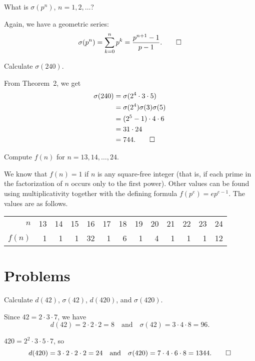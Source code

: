  What is $\sigma(p^n)$, $n = 1, 2, \dots$?
\begin{solution}
  Again, we have a geometric series:
  \begin{equation*}
    \sigma(p^n) = \sum_{k=0}^np^k = \frac{p^{n+1} - 1}{p - 1}.
    \qedhere
  \end{equation*}
\end{solution}

 Calculate $\sigma(240)$.
\begin{solution}
  From Theorem~2, we get
  \begin{align*}
    \sigma(240) &= \sigma(2^4\cdot3\cdot5) \\
                &= \sigma(2^4)\sigma(3)\sigma(5) \\
                &= (2^5 - 1)\cdot4\cdot6 \\
                &= 31\cdot24 \\
                &= 744. \qedhere
  \end{align*}
\end{solution}

 Compute $f(n)$ for $n = 13, 14, \dots, 24$.
\begin{solution}
  We know that $f(n) = 1$ if $n$ is any square-free integer (that is,
  if each prime in the factorization of $n$ occurs only to the first
  power). Other values can be found using multiplicativity together
  with the defining formula $f(p^e) = ep^{e-1}$. The values are as
  follows.
  \begin{center}
    \begin{tabular}{r|rrrrrrrrrrrr}
      $n$ & 13 & 14 & 15 & 16 & 17 & 18 & 19 & 20 & 21 & 22 & 23 & 24 \\
      $f(n)$ & 1 & 1 & 1 & 32 & 1 & 6 & 1 & 4 & 1 & 1 & 1 & 12
    \end{tabular}
  \end{center}
\end{solution}

\section{Problems}

 Calculate $d(42)$, $\sigma(42)$, $d(420)$, and
$\sigma(420)$.
\begin{solution}
  Since $42 = 2\cdot3\cdot7$, we have
  \begin{equation*}
    d(42) = 2\cdot2\cdot2 = 8
    \quad\text{and}\quad
    \sigma(42) = 3\cdot4\cdot8 = 96.
  \end{equation*}

  $420 = 2^2\cdot3\cdot5\cdot7$, so
  \begin{equation*}
    d(420) = 3\cdot2\cdot2\cdot2 = 24
    \quad\text{and}\quad
    \sigma(420) = 7\cdot4\cdot6\cdot8 = 1344. \qedhere
  \end{equation*}
\end{solution}

